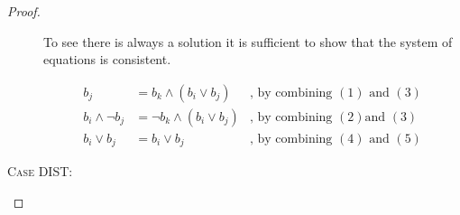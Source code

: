 \begin{proof}
\begin{description}
    To see there is always a solution it is sufficient to show that the system
    of equations is consistent.

    \begin{align}
      b_j &= b_k \wedge (b_i \vee b_j) & \mbox{, by combining $(1)$ and $(3)$} \\
      b_i \wedge \neg b_j &= \neg b_k \wedge (b_i \vee b_j) & \mbox{, by combining $(2)$
        and $(3)$} \\
        b_i \vee b_j &= b_i \vee b_j & \mbox{, by combining $(4)$ and $(5)$}
    \end{align}

  \item[\textsc{Case DIST}:]
\end{description}
\end{proof}
